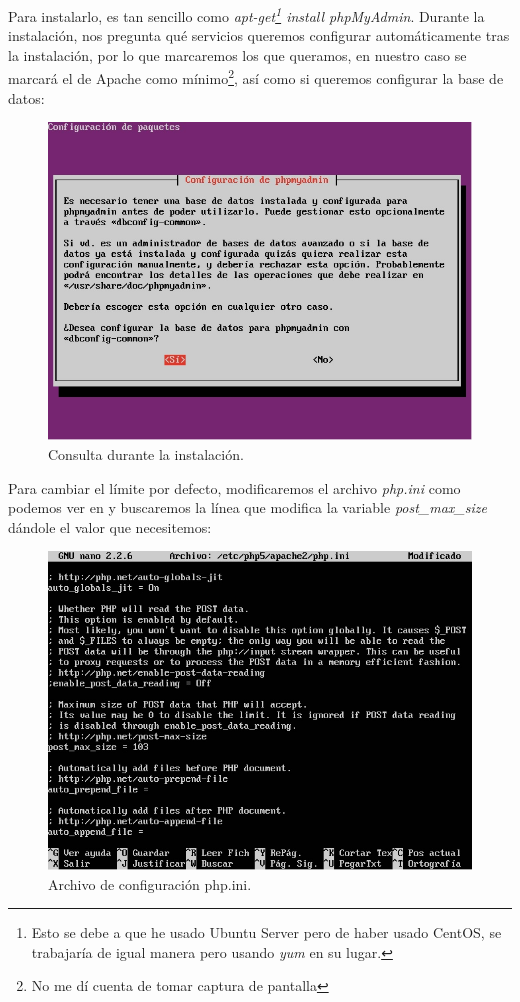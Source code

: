 \documentclass[paper=a4, fontsize=11pt]{scrartcl} %
\numberwithin{equation}{section} %
\numberwithin{figure}{section} %
\numberwithin{table}{section} %
\begin{document}
\begin{enumerate}
		Para instalarlo, es tan sencillo como \textit{apt-get\footnote{Esto se debe a que he usado
		Ubuntu Server pero de haber usado CentOS, se trabajaría de igual manera pero usando
		\textit{yum} en su lugar.} install phpMyAdmin}. Durante la instalación, nos pregunta qué
		servicios queremos configurar automáticamente tras la instalación, por lo que marcaremos los
		que queramos, en nuestro caso se marcará el de Apache como mínimo\footnote{No me dí cuenta
		de tomar captura de pantalla}, así como si queremos configurar la base de datos:
		
		\begin{figure}[H]
			\centering
			\includegraphics[width=15cm]{Ejercicio_20a.jpg}
			\caption{Consulta durante la instalación.}
			\label{fig:setup}
		\end{figure}
		
		Para cambiar el límite por defecto, modificaremos el archivo \textit{php.ini} como podemos ver
		en \cite{man_php} y buscaremos la línea que modifica la variable \textit{post\_max\_size}
		dándole el valor que necesitemos:
		
		\begin{figure}[H]
			\centering
			\includegraphics[width=15cm]{Ejercicio_20b.jpg}
			\caption{Archivo de configuración php.ini.}
			\label{fig:php}
		\end{figure}
		

\end{enumerate}
\end{document}
